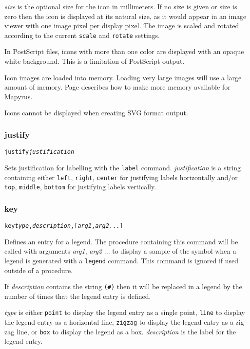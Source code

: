 \textit{size} is the optional size for the icon in millimeters.  If no size
is given or size is zero then the icon is displayed at its natural size,
as it would appear in an image viewer with one image pixel per display
pixel.
The image is scaled and rotated according to the current \texttt{scale}
and \texttt{rotate} settings.

In PostScript files, icons with more than one color
are displayed with an opaque white background.  This is a limitation
of PostScript output.

Icon images are loaded into memory.
Loading very large images will use a large amount of memory.
Page \pageref{morememory} describes how to make more memory available
for Mapyrus.

Icons cannot be displayed when creating SVG format output.

\subsubsection{justify}

\begin{alltt}
justify \textit{justification}
\end{alltt}

Sets justification for labelling with the \texttt{label} command.
\textit{justification} is a string containing either
\texttt{left}, \texttt{right}, \texttt{center} for justifying labels
horizontally and/or
\texttt{top}, \texttt{middle}, \texttt{bottom} for justifying labels
vertically.

\subsubsection{key}

\begin{alltt}
key \textit{type}, \textit{description}, [\textit{arg1}, \textit{arg2} ...]
\end{alltt}

Defines an entry for a legend.  The procedure containing this command will be
called with arguments \textit{arg1}, \textit{arg2} ... to display a sample of
the symbol when a legend is generated with a \texttt{legend} command.  This
command is ignored if used outside of a procedure.

If \textit{description} contains the string \texttt{(\#)} then it will
be replaced in a legend by the number of times that the legend entry
is defined.

\textit{type} is either
\texttt{point} to display the legend entry as a single point,
\texttt{line} to display the legend entry as a horizontal line,
\texttt{zigzag} to display the legend entry as a zig-zag line,
or
\texttt{box} to display the legend as a box.
\textit{description} is the label for the legend entry.

